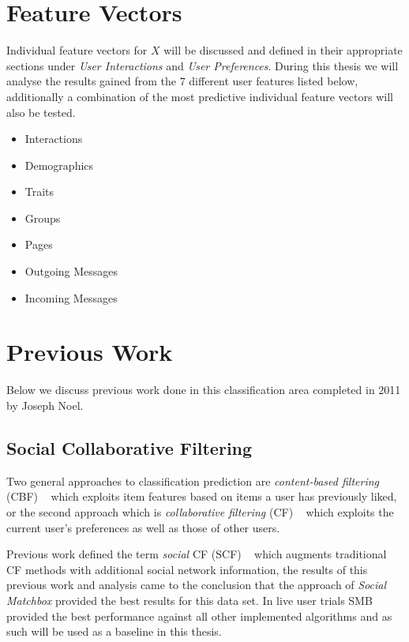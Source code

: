 \section{Feature Vectors}
\label{sec:features}

Individual feature vectors for $X$ will be discussed and defined in their appropriate sections under \emph{User Interactions} and 
\emph{User Preferences}. During this thesis we will analyse the results gained from the $7$ different user features listed below, 
additionally a combination of the most predictive individual feature vectors will also be tested.

\begin{itemize}
\item Interactions
\item Demographics
\item Traits
\item Groups
\item Pages
\item Outgoing Messages
\item Incoming Messages
\end{itemize}

\section{Previous Work}
\label{sec:pw}

Below we discuss previous work done in this classification area completed in 2011 by Joseph Noel.

\subsection{Social Collaborative Filtering}
\label{sec:cbf}

Two general approaches to classification prediction are \emph{content-based filtering} (CBF) ~\cite{newsweeder} which exploits 
item features based on items a user has previously liked, or the second approach which is \emph{collaborative filtering} (CF) 
~\cite{collab_filtering} which exploits the current user's preferences as well as those of other users.

Previous work defined the term \emph{social} CF (SCF) ~\cite{joseph} which augments traditional CF methods with additional social 
network information, the results of this previous work and analysis came to the conclusion that the approach of \emph{Social Matchbox}
provided the best results for this data set. In live user trials SMB provided the best performance against all other implemented 
algorithms and as such will be used as a baseline in this thesis.

